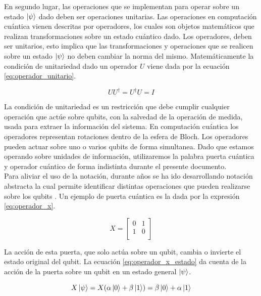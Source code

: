 En segundo lugar, las operaciones que se implementan para operar sobre un estado $\ket{\psi}$ dado deben ser operaciones unitarias. Las operaciones en computación cuántica vienen descritas por operadores, los cuales son objetos matemáticos que realizan transformaciones sobre un estado cuántico dado. Los operadores, deben ser unitarios, esto implica que las transformaciones y operaciones que se realicen sobre un estado $\ket{\psi}$ no deben cambiar la norma del mismo. Matemáticamente la condición de  unitariedad dado un operador $U$ viene dada por la ecuación \ref{eq:operador_unitario}.

\begin{equation}
    U U^{\dagger} = U^{\dagger} U = I
    \label{eq:operador_unitario}
\end{equation}

\newpage

La condición de unitariedad es un restricción que debe cumplir cualquier operación que actúe sobre qubits, con la salvedad de la operación de medida, usada para extraer la información del sistema. En computación cuántica los operadores representan rotaciones dentro de la esfera de Bloch. Los operadores pueden actuar sobre uno o varios qubits de forma simultanea. Dado que estamos operando sobre unidades de información, utilizaremos la palabra puerta cuántica y operador cuántico de forma indistinta durante el presente documento.  \\

Para aliviar el uso de la notación, durante años se ha ido desarrollando notación abstracta la cual permite identificar distintas operaciones que pueden realizarse sobre los qubits \citep{diVincenzo}. Un ejemplo de puerta cuántica es la dada por la expresión \ref{eq:operador_x}.


\begin{equation}
    X = \begin{bmatrix}
    0 & 1 \\
    1 & 0 \\
    \end{bmatrix}
    \label{eq:operador_x}
\end{equation}

La acción de esta puerta, que solo actúa sobre un qubit, cambia o invierte el estado original del qubit. La ecuación \ref{eq:operador_x_estado} da cuenta de la acción de la puerta sobre un qubit en un estado general $\ket{\psi}$.

\begin{equation}
    X \ket{\psi} = X(\alpha\ket{0} + \beta\ket{1}) = \beta\ket{0} + \alpha\ket{1}
    \label{eq:operador_x_estado}
\end{equation}

